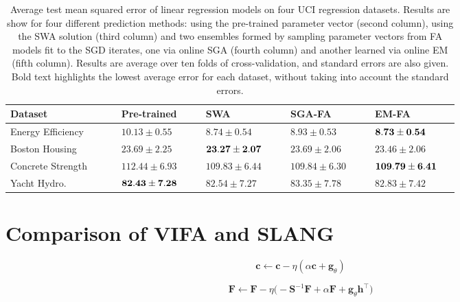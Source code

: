 \documentclass[msc,deptreport.inf]{infthesis} %
\newcommand{\matr}[1]{\mathbf{#1}}
\begin{document}
 \begin{table}[h!]
	\begin{center}
		\begin{tabular}{|| p{0.21\linewidth} p{0.16\linewidth} p{0.16\linewidth} p{0.16\linewidth} p{0.16\linewidth} ||} 
 			\hline
 			Dataset & Pre-trained & SWA & SGA-FA & EM-FA \\ [0.5ex] 
 			\hline\hline
			Energy Efficiency & $10.13 \pm 0.55$ & $8.74 \pm 0.54$ & $8.93 \pm 0.53$ & $\bf{8.73 \pm 0.54}$ \\
			Boston Housing & $23.69 \pm 2.25$ & $\bf{23.27 \pm 2.07}$ & $23.69 \pm 2.06$ & $23.46 \pm 2.06$ \\
			Concrete Strength & $112.44 \pm 6.93$ & $109.83 \pm 6.44$ & $109.84 \pm 6.30$ & $\bf{109.79 \pm 6.41}$ \\
			Yacht Hydro. & $\bf{82.43 \pm 7.28}$ & $82.54 \pm 7.27$ & $83.35 \pm 7.78$ & $82.83 \pm 7.42$ \\ [1ex] 
			\hline
		\end{tabular}
		\caption{Average test mean squared error of linear regression models on four UCI regression datasets. Results are show for four different prediction methods: using the pre-trained parameter vector (second column), using the SWA solution (third column) and two ensembles formed by sampling parameter vectors from FA models fit to the SGD iterates, one via online SGA (fourth column) and another learned via online EM (fifth column). Results are average over ten folds of cross-validation, and standard errors are also given. Bold text highlights the lowest average error for each dataset, without taking into account the standard errors.}
		\label{table:linear_regression_mse}
	\end{center}
\end{table}


\section{Comparison of VIFA and SLANG}

\begin{equation}
	\matr{c} \leftarrow \matr{c} - \eta(\alpha \matr{c} + \matr{g}_\theta)
\end{equation}

\begin{equation}
	\matr{F} \leftarrow \matr{F} - \eta \big(-\matr{S}^{-1} \matr{F} + \alpha \matr{F} + \matr{g}_\theta \matr{h}^\intercal \big)
\end{equation}
\end{document}
